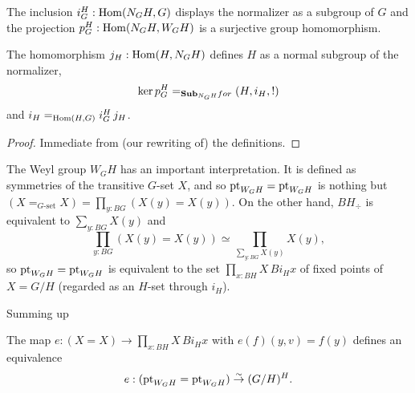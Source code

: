 

\begin{lemma}
  The inclusion $i_G^H:\mathrm{Hom}(N_GH,G)$ displays the normalizer as a subgroup of $G$ and the projection $p_G^H:\mathrm{Hom}(N_GH,W_GH)$ is a surjective group homomorphism.  

The homomorphism $j_H:\mathrm{Hom}(H,N_GH)$ defines $H$ as a normal subgroup of the normalizer,
$$\ker p_G^H=_{\mathbf{Sub}_{N_GH}for}(H,i_H,!)$$
and $i_H=_{\mathrm{Hom}(H,G)}i_G^H\,j_H$.
\end{lemma}
\begin{proof}
  Immediate from (our rewriting of) the definitions.
\end{proof}

The Weyl group $W_GH$ has an important interpretation.  It is defined as symmetries of the transitive $G$-set $X$, and so $\mathrm{pt}_{W_GH}=\mathrm{pt}_{W_GH}$ is nothing but $(X=_{G\text{-set}}X)=\prod_{y:BG}(X(y)=X(y))$.  On the other hand, $BH_\div$ is equivalent to $\sum_{y:BG}X(y)$ and 
$$\prod_{y:BG}(X(y)=X(y))\simeq \prod_{\sum_{y:BG}X(y)}X(y),$$ so $\mathrm{pt}_{W_GH}=\mathrm{pt}_{W_GH}$ is equivalent to the set $%
\prod_{x:BH}X\, Bi_Hx$ of fixed points of $X=G/H$ (regarded as an $H$-set through $i_H$).

Summing up
\begin{lemma}
  \label{lem:WGHisHfixofG/H}
  The map  $e:(X=X)\to \prod_{x:BH}X\, Bi_Hx$ with $e(f)(y,v)=f(y)$ defines an equivalence
$$e:(\mathrm{pt}_{W_GH}=\mathrm{pt}_{W_GH})\overset\sim\to (G/H)^H.$$ 
\end{lemma}





